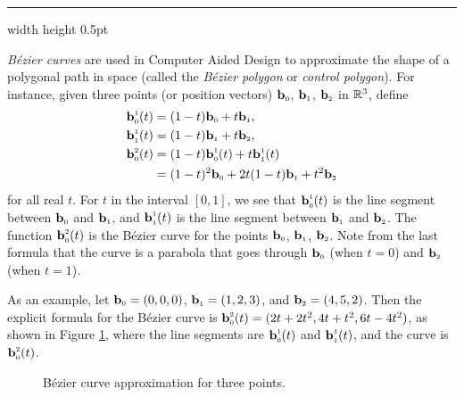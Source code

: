 \vspace{2mm}
\hrule width \textwidth height 0.5pt
\begin{exmp}\label{exmp:bezier}
 \emph{B\'{e}zier curves} are used in Computer Aided Design to approximate the shape of a
 polygonal path in space (called the \emph{B\'{e}zier polygon} or \emph{control polygon}). For instance, given three
 points (or position vectors) $\textbf{b}_{\scriptscriptstyle 0}$, $\textbf{b}_{\scriptscriptstyle 1}$, $\textbf{b}_{\scriptscriptstyle 2}$ in $\mathbb{R}^{3}$,
 define
 \begin{align*}
  \ssub{\textbf{b}}{0}^{\scriptscriptstyle 1}(t) &= ( 1 - t )\ssub{\textbf{b}}{0} + t \ssub{\textbf{b}}{1},\\
  \ssub{\textbf{b}}{1}^{\scriptscriptstyle 1}(t) &= ( 1 - t )\ssub{\textbf{b}}{1} + t \ssub{\textbf{b}}{2},\vspace{1mm}\\
  \ssub{\textbf{b}}{0}^{\scriptscriptstyle 2}(t) &=
  ( 1 - t )\ssub{\textbf{b}}{0}^{\scriptscriptstyle 1}(t) + t \ssub{\textbf{b}}{1}^{\scriptscriptstyle 1}(t)\\
  &= (1 - t)^2 \ssub{\textbf{b}}{0} + 2t(1 - t) \ssub{\textbf{b}}{1} + t^2 \ssub{\textbf{b}}{2}
 \end{align*}
 for all real $t$. For $t$ in the interval $[0,1]$, we see that $\textbf{b}_{\scriptscriptstyle 0}^{\scriptscriptstyle 1}(t)$ is the
 line segment between $\textbf{b}_{\scriptscriptstyle 0}$ and $\textbf{b}_{\scriptscriptstyle 1}$, and
 $\textbf{b}_{\scriptscriptstyle 1}^{\scriptscriptstyle 1}(t)$ is the line segment between $\textbf{b}_{\scriptscriptstyle 1}$ and
 $\textbf{b}_{\scriptscriptstyle 2}$. The function $\textbf{b}_{\scriptscriptstyle 0}^{\scriptscriptstyle 2}(t)$ is the
 B\'{e}zier curve for the points $\textbf{b}_{\scriptscriptstyle 0}$, $\textbf{b}_{\scriptscriptstyle 1}$, $\textbf{b}_{\scriptscriptstyle 2}$. Note from the
 last formula that the curve is a parabola that goes through $\textbf{b}_{\scriptscriptstyle 0}$ (when $t = 0$) and
 $\textbf{b}_{\scriptscriptstyle 2}$ (when $t = 1$).
 
 As an example, let $\textbf{b}_{\scriptscriptstyle 0} = (0,0,0)$, $\textbf{b}_{\scriptscriptstyle 1} = (1,2,3)$, and $\textbf{b}_{\scriptscriptstyle 2} =
 (4,5,2)$. Then the explicit formula for the B\'{e}zier curve is
 $\textbf{b}_{\scriptscriptstyle 0}^{\scriptscriptstyle 2}(t) = ( 2t + 2t^2, 4t + t^2, 6t - 4t^2 )$, as shown in Figure
 \ref{fig:bezier2}, where the line segments are $\textbf{b}_{\scriptscriptstyle 0}^{\scriptscriptstyle 1}(t)$ and
 $\textbf{b}_{\scriptscriptstyle 1}^{\scriptscriptstyle 1}(t)$, and the curve is
 $\textbf{b}_{\scriptscriptstyle 0}^{\scriptscriptstyle 2}(t)$.\vspace{-0mm}
 \begin{figure}[h]
  \begin{center}
   
  \end{center}\vspace{-0mm}
 \caption[]{\quad B\'{e}zier curve approximation for three points.}
 \label{fig:bezier2}
 \end{figure}


\end{exmp}
